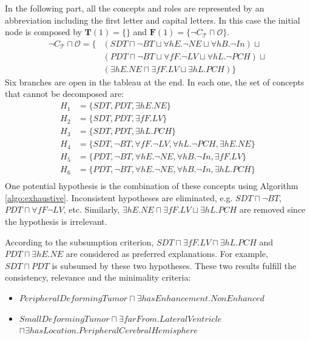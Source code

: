 \documentclass{article}
\begin{document}
In the following part, all the concepts and roles are represented by an abbreviation including the first letter and capital letters.
In this case the initial node is composed by $\mathbf{T}(1)=\{\}$ and $\mathbf{F}(1)=\{\neg C_\mathcal{T}\sqcap \mathcal{O}\}$.
\begin{align*}
 \neg C_\mathcal{T}\sqcap \mathcal{O}= \{ &(SDT \sqcap \neg BT \sqcup \forall hE. \neg NE \sqcup \forall hB. \neg In) \sqcup \\
 &(PDT \sqcap \neg BT \sqcup \forall fF. \neg LV \sqcup \forall hL. \neg PCH) \sqcup \\
 &(\exists hE. NE \sqcap \exists fF. LV \sqcup \exists hL.PCH )\}
\end{align*}
Six branches are open in the tableau at the end. In each one, the set of concepts that cannot be decomposed are:
 \begin{align*}
  H_1&=\{ SDT, PDT, \exists hE.NE\}\\
  H_2&=\{ SDT, PDT, \exists fF.LV\}\\
  H_3&=\{ SDT, PDT, \exists hL.PCH\}\\
  H_4&=\{ SDT, \neg BT, \forall fF. \neg LV, \forall hL. \neg PCH, \exists hE.NE\}\\
  H_5&=\{ PDT, \neg BT, \forall hE. \neg NE, \forall hB. \neg In, \exists fF.LV\}\\
  H_6&=\{ PDT, \neg BT, \forall hE. \neg NE, \forall hB. \neg In, \exists hL.PCH\}\\
 \end{align*}
One potential hypothesis is the combination of these concepts using Algorithm \ref{algo:exhaustive}.
Inconsistent hypotheses are eliminated, e.g.
 $SDT \sqcap \neg BT$, 
$PDT \sqcap \forall fF \neg LV$, etc.
Similarly,
$\exists hE. NE \sqcap \exists fF. LV \sqcup \exists hL.PCH $
are removed since the hypothesis is irrelevant.

According to the subsumption criterion, $SDT \sqcap \exists fF.LV \sqcap \exists hL.PCH$
and $PDT \sqcap \exists hE.NE$ are considered as preferred explanations. For example, 
$SDT \sqcap PDT$ is subsumed by these two hypotheses. 
These two results fulfill the consistency, relevance and the minimality criteria:
\begin{itemize}
 \item $PeripheralDeformingTumor \sqcap \exists hasEnhancement. NonEnhanced$
 \item $SmallDeformingTumor\sqcap \exists farFrom. LateralVentricle $\\ $\sqcap \exists hasLocation. PeripheralCerebralHemisphere$
\end{itemize}




\end{document}
